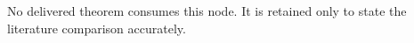 No delivered theorem consumes this node. It is retained only to state the literature comparison accurately.